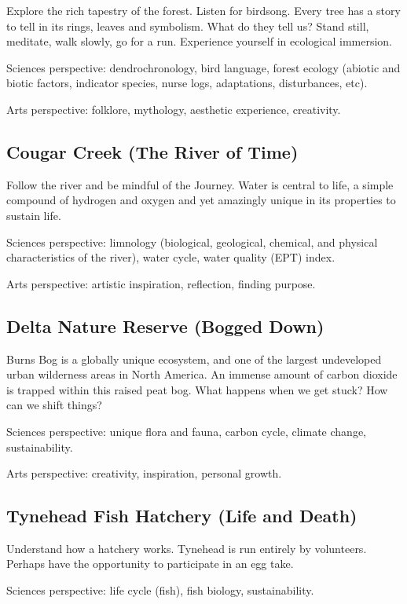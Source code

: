 \documentclass[12pt, letterpaper]{article}
\begin{document}
Explore the rich tapestry of the forest. Listen for birdsong. Every tree
has a story to tell in its rings, leaves and symbolism. What do they
tell us? Stand still, meditate, walk slowly, go for a run. Experience
yourself in ecological immersion.

Sciences perspective: dendrochronology, bird language, forest ecology (abiotic
and biotic factors, indicator species, nurse logs, adaptations,
disturbances, etc).

Arts perspective: folklore, mythology, aesthetic
experience, creativity.

\subsection{Cougar Creek (The River of Time)}

Follow the river and be mindful of the Journey. Water is central to
life, a simple compound of hydrogen and oxygen and yet amazingly unique
in its properties to sustain life.

Sciences perspective: limnology (biological, geological, chemical, and physical
characteristics of the river), water cycle, water quality (EPT) index.

Arts perspective: artistic inspiration, reflection, finding purpose.

\subsection{Delta Nature Reserve (Bogged Down)}

Burns Bog is a globally unique ecosystem, and one of the largest
undeveloped urban wilderness areas in North America. An immense amount
of carbon dioxide is trapped within this raised peat bog. What happens
when we get stuck? How can we shift things?

Sciences perspective: unique flora and fauna, carbon cycle, climate change,
sustainability.

Arts perspective: creativity, inspiration, personal growth.

\subsection{Tynehead Fish Hatchery (Life and Death)}

Understand how a hatchery works. Tynehead is run entirely by volunteers.
Perhaps have the opportunity to participate in an egg take.

Sciences perspective: life cycle (fish), fish biology, sustainability.
\end{document}
